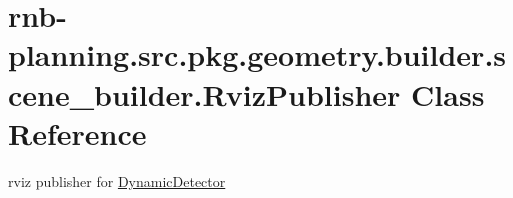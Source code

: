 \hypertarget{classrnb-planning_1_1src_1_1pkg_1_1geometry_1_1builder_1_1scene__builder_1_1_rviz_publisher}{}\section{rnb-\/planning.src.\+pkg.\+geometry.\+builder.\+scene\+\_\+builder.\+Rviz\+Publisher Class Reference}
\label{classrnb-planning_1_1src_1_1pkg_1_1geometry_1_1builder_1_1scene__builder_1_1_rviz_publisher}


rviz publisher for \hyperlink{classrnb-planning_1_1src_1_1pkg_1_1geometry_1_1builder_1_1scene__builder_1_1_dynamic_detector}{Dynamic\+Detector}  


